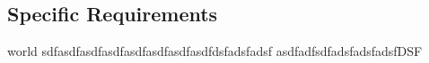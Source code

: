 \documentclass[11pt]{article}
\begin{document}
\begin{minipage}[t]{0.5\textwidth}
\begin{flushleft}
\section*{Specific Requirements}
world sdfasdfasdfasdfasdfasdfasdfasdfdsfadsfadsf
asdfadfsdfadsfadsfadsfDSF
\end{flushleft}
\end{minipage}
\begin{minipage}[t]{0.5\textwidth}
\begin{flushright}


\end{flushright}
\end{minipage}
\end{document}
